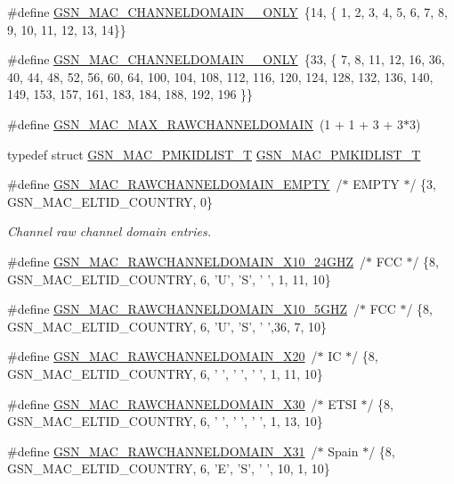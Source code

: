 \begin{DoxyCompactItemize}
\item 
\#define \hyperlink{a00642_ga1902c2b82dd9530b1f76e7aa03cad775}{GSN\_\-MAC\_\-CHANNELDOMAIN\_\_\-ONLY}~\{14, \{ 1,  2,  3,  4,  5,  6,  7,  8,  9, 10, 11, 12, 13, 14\}\}
\item 
\#define \hyperlink{a00642_ga700daf355821d5d26cb0d2f346a1a969}{GSN\_\-MAC\_\-CHANNELDOMAIN\_\_\-ONLY}~\{33, \{ 7,  8, 11, 12, 16, 36, 40, 44, 48, 52, 56, 60, 64, 100, 104, 108, 112, 116, 120, 124, 128, 132, 136, 140, 149, 153, 157, 161, 183, 184, 188, 192, 196 \}\}
\item 
\#define \hyperlink{a00642_gab2030e7c4ab461cd034d5ee1ef004372}{GSN\_\-MAC\_\-MAX\_\-RAWCHANNELDOMAIN}~(1 + 1 + 3 + 3$\ast$3)
\end{DoxyCompactItemize}
\begin{DoxyCompactItemize}
\item 
typedef struct \hyperlink{a00121}{GSN\_\-MAC\_\-PMKIDLIST\_\-T} \hyperlink{a00642_ga93df35fe1df8b6cf9f020c78019dd58c}{GSN\_\-MAC\_\-PMKIDLIST\_\-T}
\item 
\#define \hyperlink{a00642_ga56ae91b81107b9438ab55637317cab2c}{GSN\_\-MAC\_\-RAWCHANNELDOMAIN\_\-EMPTY}~/$\ast$ EMPTY  $\ast$/ \{3, GSN\_\-MAC\_\-ELTID\_\-COUNTRY, 0\}
\begin{DoxyCompactList}\small\item\em Channel raw channel domain entries. \end{DoxyCompactList}\item 
\#define \hyperlink{a00642_ga500c98f87ed8a4f3682e4b1b660bfe3d}{GSN\_\-MAC\_\-RAWCHANNELDOMAIN\_\-X10\_\-24GHZ}~/$\ast$ FCC    $\ast$/ \{8, GSN\_\-MAC\_\-ELTID\_\-COUNTRY, 6, 'U', 'S', ' ', 1, 11, 10\}
\item 
\#define \hyperlink{a00642_ga942c8bca51fccd885216a358eb762f55}{GSN\_\-MAC\_\-RAWCHANNELDOMAIN\_\-X10\_\-5GHZ}~/$\ast$ FCC    $\ast$/  \{8, GSN\_\-MAC\_\-ELTID\_\-COUNTRY, 6, 'U', 'S', ' ',36,  7, 10\}
\item 
\#define \hyperlink{a00642_gacbfcc1079a6c770488a643ba72c66f78}{GSN\_\-MAC\_\-RAWCHANNELDOMAIN\_\-X20}~/$\ast$ IC     $\ast$/ \{8, GSN\_\-MAC\_\-ELTID\_\-COUNTRY, 6, ' ', ' ', ' ', 1, 11, 10\}
\item 
\#define \hyperlink{a00642_gae86f5fe270e13731354c040379263373}{GSN\_\-MAC\_\-RAWCHANNELDOMAIN\_\-X30}~/$\ast$ ETSI   $\ast$/ \{8, GSN\_\-MAC\_\-ELTID\_\-COUNTRY, 6, ' ', ' ', ' ', 1, 13, 10\}
\item 
\#define \hyperlink{a00642_ga8f1d8d62d0476db2e67ae76fbbd8edcb}{GSN\_\-MAC\_\-RAWCHANNELDOMAIN\_\-X31}~/$\ast$ Spain  $\ast$/ \{8, GSN\_\-MAC\_\-ELTID\_\-COUNTRY, 6, 'E', 'S', ' ', 10, 1, 10\}

\end{DoxyCompactItemize}
